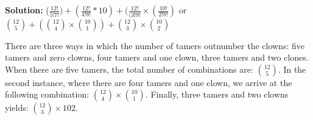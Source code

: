 \documentclass{article}
\begin{document}
\subsection{}

\textbf{Solution: } ($\frac{12!}{5!7!}) + (\frac{12!}{4!8!} * 10) + (\frac{12!}{(3!9!} \times  (\frac{10!}{2!8!})$ or $\binom{12}{5} + (\binom{12}{4} \times \binom{10}{1}) + \binom{12}{3} \times \binom{10}{2}$

There are three ways in which the number of tamers outnumber the clowns: five tamers and zero clowns, four tamers and one clown, three tamers and two clones.  When there are five tamers, the total number of combinations are: $\binom{12}{5}$. In the second instance, where there are four tamers and one clown, we arrive at the following combination: $\binom{12}{4} \times \binom{10}{1}$. Finally, three tamers and two clowns yields: $\binom{12}{3} \times {10}{2}$.
\end{document}
